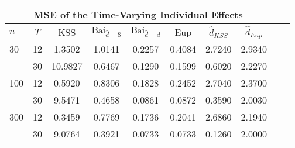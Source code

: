 \begin{tabular}{lccccccccc} 
\hline \multicolumn{8}{c}{MSE of the Time-Varying Individual Effects} \\ \hline 
$n$ & $T$ & KSS & $ \text{Bai}_{\hat{d} = 8}$ & $\text{Bai}_{\hat{d} = d}$ & Eup & $\hat{d}_{KSS}$ & $\hat{d}_{Eup}$ \\
\hline
30 & 12 &  1.3502  &  1.0141  &  0.2257  &  0.4084  &  2.7240  &  2.9340  \\
& 30 &  10.9827  &  0.6467  &  0.1290  &  0.1599  &  0.6020  &  2.2270  \\
100 & 12 &  0.5920  &  0.8306  &  0.1828  &  0.2452  &  2.7040  &  2.3700  \\
& 30 &  9.5471  &  0.4658  &  0.0861  &  0.0872  &  0.3590  &  2.0030  \\
300 & 12 &  0.3459  &  0.7769  &  0.1736  &  0.2041  &  2.6860  &  2.1940  \\
& 30 &  9.0764  &  0.3921  &  0.0733  &  0.0733  &  0.1260  &  2.0000  \\
\end{tabular} 
